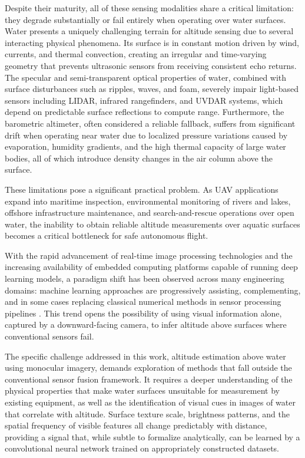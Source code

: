 Despite their maturity, all of these sensing modalities share a critical limitation: they degrade substantially or fail entirely when operating over water surfaces. Water presents a uniquely challenging terrain for altitude sensing due to several interacting physical phenomena. Its surface is in constant motion driven by wind, currents, and thermal convection, creating an irregular and time-varying geometry that prevents ultrasonic sensors from receiving consistent echo returns. The specular and semi-transparent optical properties of water, combined with surface disturbances such as ripples, waves, and foam, severely impair light-based sensors including LIDAR, infrared rangefinders, and UVDAR systems, which depend on predictable surface reflections to compute range. Furthermore, the barometric altimeter, often considered a reliable fallback, suffers from significant drift when operating near water due to localized pressure variations caused by evaporation, humidity gradients, and the high thermal capacity of large water bodies, all of which introduce density changes in the air column above the surface.

These limitations pose a significant practical problem. As UAV applications expand into maritime inspection, environmental monitoring of rivers and lakes, offshore infrastructure maintenance, and search-and-rescue operations over open water, the inability to obtain reliable altitude measurements over aquatic surfaces becomes a critical bottleneck for safe autonomous flight.\cite{UAVCivilAppsJATM}

With the rapid advancement of real-time image processing technologies and the increasing availability of embedded computing platforms capable of running deep learning models, a paradigm shift has been observed across many engineering domains: machine learning approaches are progressively assisting, complementing, and in some cases replacing classical numerical methods in sensor processing pipelines \cite{UAVSensorDNN}. This trend opens the possibility of using visual information alone, captured by a downward-facing camera, to infer altitude above surfaces where conventional sensors fail.

The specific challenge addressed in this work, altitude estimation above water using monocular imagery, demands exploration of methods that fall outside the conventional sensor fusion framework. It requires a deeper understanding of the physical properties that make water surfaces unsuitable for measurement by existing equipment, as well as the identification of visual cues in images of water that correlate with altitude.\cite{VIAENetAltitude} Surface texture scale, brightness patterns, and the spatial frequency of visible features all change predictably with distance, providing a signal that, while subtle to formalize analytically, can be learned by a convolutional neural network trained on appropriately constructed datasets.\cite{WaterDepthSpecular}

